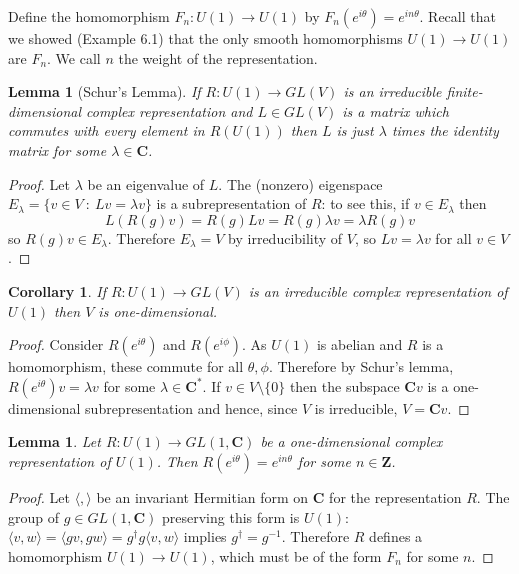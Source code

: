 \documentclass[12pt]{article}
\newcommand{\CC}{\mathbf{C}}
\newcommand{\ZZ}{\mathbf{Z}}
\newtheorem{lma}[thm]{Lemma}
\newtheorem{cor}[thm]{Corollary}
\theoremstyle{definition}
\theoremstyle{check}
\theoremstyle{remark}
\theoremstyle{TheoremNum}
\begin{document}
Define the homomorphism $F_n\colon U(1)\to U(1)$ by $F_n(e^{i\theta})=e^{in\theta}$. Recall that we showed (Example 6.1) that the only smooth homomorphisms $U(1)\to U(1)$ are $F_n$. We call $n$ the weight of the representation.
\begin{lma}[Schur's Lemma]
If $R\colon U(1)\to GL(V)$ is an irreducible finite-dimensional complex representation and $L\in GL(V)$ is a matrix which commutes with every element in $R(U(1))$ then $L$ is just $\lambda$ times the identity matrix for some $\lambda\in\CC$.
\end{lma}
\begin{proof}
Let $\lambda$ be an eigenvalue of $L$. The (nonzero) eigenspace $E_{\lambda}=\{v\in V\ :\ Lv=\lambda v\}$ is a subrepresentation of $R$: to see this, if $v\in E_{\lambda}$ then
\[L(R(g)v)=R(g)Lv=R(g)\lambda v=\lambda R(g)v\]
so $R(g)v\in E_{\lambda}$. Therefore $E_{\lambda}=V$ by irreducibility of $V$, so $Lv=\lambda v$ for all $v\in V$.
\end{proof}
\begin{cor}
If $R\colon U(1)\to GL(V)$ is an irreducible complex representation of $U(1)$ then $V$ is one-dimensional.
\end{cor}
\begin{proof}
Consider $R(e^{i\theta})$ and $R(e^{i\phi})$. As $U(1)$ is abelian and $R$ is a homomorphism, these commute for all $\theta,\phi$. Therefore by Schur's lemma, $R(e^{i\theta})v=\lambda v$ for some $\lambda\in\CC^*$. If $v\in V\setminus\{0\}$ then the subspace $\CC v$ is a one-dimensional subrepresentation and hence, since $V$ is irreducible, $V=\CC v$.
\end{proof}
\begin{lma}
Let $R\colon U(1)\to GL(1,\CC)$ be a one-dimensional complex representation of $U(1)$. Then $R(e^{i\theta})=e^{in\theta}$ for some $n\in\ZZ$.
\end{lma}
\begin{proof}
Let $\langle,\rangle$ be an invariant Hermitian form on $\CC$ for the representation $R$. The group of $g\in GL(1,\CC)$ preserving this form is $U(1)$: $\langle v,w\rangle=\langle gv,gw\rangle=g^{\dagger}g\langle v,w\rangle$ implies $g^{\dagger}=g^{-1}$. Therefore $R$ defines a homomorphism $U(1)\to U(1)$, which must be of the form $F_n$ for some $n$.
\end{proof}
\end{document}
